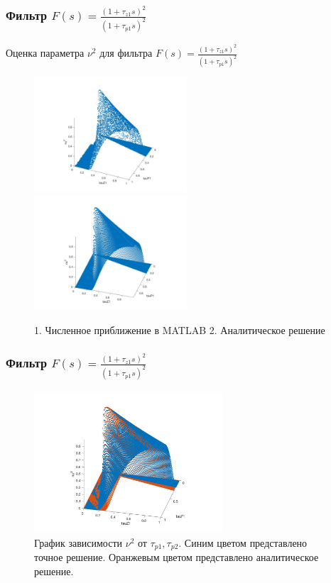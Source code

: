 \documentclass{beamer}
\begin{document}

\begin{frame}
\frametitle{Фильтр $F(s) = \frac{(1+\tau_{z1}s)^2}{(1+\tau_{p1}s)^2}$}

Оценка параметра $\nu^2$ для фильтра $F(s) = \frac{(1+\tau_{z1}s)^2}{(1+\tau_{p1}s)^2}$
  \begin{figure}[H]
  \includegraphics[width=5.7cm]{../images/filter2_tau0_1e.jpg}
  \includegraphics[width=5.7cm]{../images/filter2_tau0_1.jpg}
    \caption{1. Численное приближение в MATLAB 2. Аналитическое решение}
    \end{figure}

\end{frame}

\begin{frame}
\frametitle{Фильтр $F(s) = \frac{(1+\tau_{z1}s)^2}{(1+\tau_{p1}s)^2}$}

  \begin{figure}[H] 
  \includegraphics[width=7cm]{../images/main.jpg}
\caption{График зависимости $\nu^2$ от $\tau_{p1}, \tau_{p2}$.  Синим цветом представлено точное решение. Оранжевым цветом представлено аналитическое решение.}
\end{figure}

\end{frame}
\end{document}
